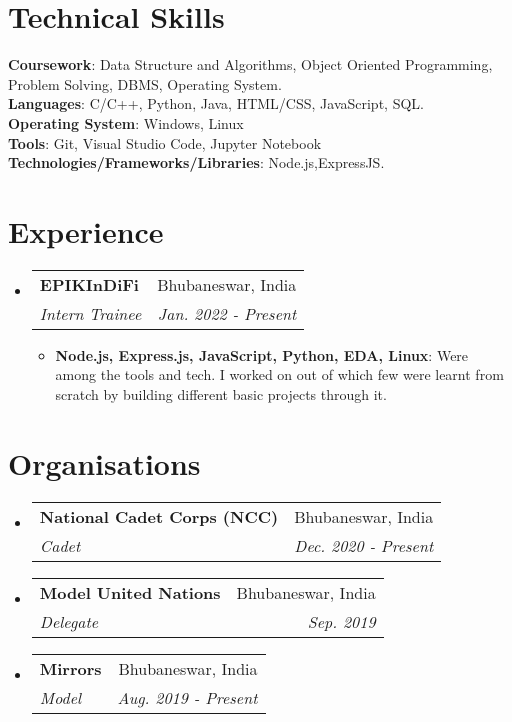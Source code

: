 \documentclass[letterpaper,11pt]{article}
\makeatletter
\newcommand{\resumeItem}[2]{
  \item\small{
    \textbf{#1}{: #2 \vspace{-2pt}}
  }
}
\newcommand{\resumeSubheading}[4]{
  \vspace{-1pt}\item
    \begin{tabular*}{0.97\textwidth}[t]{l@{\extracolsep{\fill}}r}
      \textbf{#1} & #2 \\
      \textit{\small#3} & \textit{\small #4} \\
    \end{tabular*}\vspace{-5pt}
}
\newcommand{\resumeSubSubheading}[2]{
    \begin{tabular*}{0.97\textwidth}{l@{\extracolsep{\fill}}r}
      \textit{\small#1} & \textit{\small #2} \\
    \end{tabular*}\vspace{-5pt}
}
\newcommand{\resumeSubHeadingListStart}{\begin{itemize}[leftmargin=*]}
\newcommand{\resumeSubHeadingListEnd}{\end{itemize}}
\newcommand{\resumeItemListStart}{\begin{itemize}}
\newcommand{\resumeItemListEnd}{\end{itemize}\vspace{-5pt}}
\makeatother
\begin{document}
\section{Technical Skills}
 \begin{itemize}[leftmargin=0.15in, label={}]
	\small{\item{
		\textbf{Coursework}{: Data Structure and Algorithms, Object Oriented Programming, Problem Solving, DBMS, Operating System.} \\
 	\textbf{Languages}{: C/C++, Python, Java, HTML/CSS, JavaScript, SQL.} \\
 		\textbf{Operating System}{: Windows, Linux}\\
 		\textbf{Tools}{: Git, Visual Studio Code, Jupyter Notebook}\\
  	\textbf{Technologies/Frameworks/Libraries}{: Node.js,ExpressJS.} \\
	}}
 \end{itemize}
 \vspace{-16pt}
 

\section{Experience}
  \resumeSubHeadingListStart

    \resumeSubheading
      {EPIKInDiFi}{Bhubaneswar, India}
      {Intern Trainee}{Jan. 2022 - Present}
      \resumeItemListStart
        \resumeItem{Node.js, Express.js, JavaScript, Python, EDA, Linux}
          {Were among the tools and tech. I worked on out of which few were learnt from scratch by building different basic projects through it.}
      \resumeItemListEnd
    \resumeSubHeadingListEnd
      
      

      
%

\section{Organisations}
\resumeSubHeadingListStart
  \resumeSubheading
      {National Cadet Corps (NCC)}{Bhubaneswar, India}
      {Cadet}{Dec. 2020 - Present}
    \resumeSubheading
      {Model United Nations}{Bhubaneswar, India}
      {Delegate}{Sep. 2019}
    \resumeSubheading
      {Mirrors}{Bhubaneswar, India}
      {Model}{Aug. 2019 - Present}
\resumeSubHeadingListEnd
\end{document}
